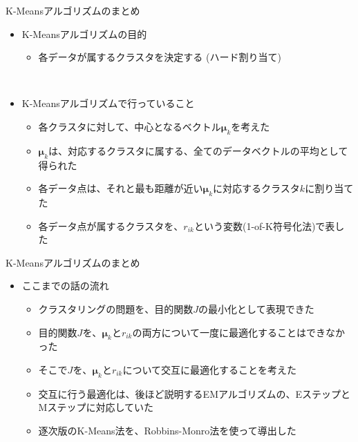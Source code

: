 \documentclass[dvipdfmx,notheorems,t]{beamer}
\begin{document}
\begin{frame}{K-Meansアルゴリズムのまとめ}

\begin{itemize}
	\item K-Meansアルゴリズムの目的
	\begin{itemize}
		\item 各データが属するクラスタを決定する (\alert{ハード割り当て})
	\end{itemize} \
	
	\item K-Meansアルゴリズムで行っていること
	\begin{itemize}
		\item 各クラスタに対して、中心となるベクトル$\bm{\mu}_k$を考えた
		\item $\bm{\mu}_k$は、対応するクラスタに属する、全てのデータベクトルの平均として得られた
		\item 各データ点は、それと最も距離が近い$\bm{\mu}_k$に対応するクラスタ$k$に割り当てた
		\item 各データ点が属するクラスタを、$r_{ik}$という変数(1-of-K符号化法)で表した
	\end{itemize}
\end{itemize}

\end{frame}

\begin{frame}{K-Meansアルゴリズムのまとめ}

\begin{itemize}
	\item ここまでの話の流れ
	\begin{itemize}
		\item クラスタリングの問題を、目的関数$J$の最小化として表現できた
		\item 目的関数$J$を、$\bm{\mu}_k$と$r_{ik}$の両方について一度に最適化することはできなかった
		\item そこで$J$を、$\bm{\mu}_k$と$r_{ik}$について\alert{交互に最適化}することを考えた
		\newline
		\item 交互に行う最適化は、後ほど説明するEMアルゴリズムの、EステップとMステップに対応していた
		\newline
		\item 逐次版のK-Means法を、Robbins-Monro法を使って導出した
	\end{itemize}
\end{itemize}

\end{frame}
\end{document}

